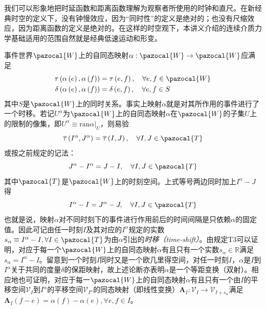 \documentclass[main.tex]{subfiles}
\begin{document}
我们可以形象地把时延函数和距离函数理解为观察者所使用的时钟和直尺。在新经典时空的定义下，没有钟慢效应，因为“同时性”的定义是绝对的；也没有尺缩效应，因为距离函数的定义是绝对的。在这样的时空观下，本讲义介绍的连续介质力学基础适用的范围自然就是经典低速运动和形变。

事件世界$\pazocal{W}$上的自同态映射$\alpha:\pazocal{W}\rightarrow\pazocal{W}$应满足
\begin{align*}
    \tau\left(\alpha\left(e\right),\alpha\left(f\right)\right)   & =\tau\left(e,f\right),\quad\forall e,f\in\pazocal{W} \\
    \delta\left(\alpha\left(e\right),\alpha\left(f\right)\right) & =\delta\left(e,f\right),\quad\forall e,f\in S
\end{align*}
其中$S$是$\pazocal{W}$上的同时关系。事实上映射$\alpha$就是对其所作用的事件进行了一个时移。若记$U^\alpha$为$\pazocal{W}$上的自同态映射$\alpha$在$\pazocal{W}$的子集$U$上的限制的像集，即$U^\alpha\equiv\mathrm{ran}\left.\alpha\right|_U$，则易验
\[\overline{\tau}\left(I^\alpha,J^\alpha\right)=\overline\tau\left(I,J\right),\quad\forall I,J\in\pazocal{T}\]
或按之前规定的记法：
\[J^\alpha-I^\alpha=J-I,\quad\forall I,J\in\pazocal{T}\]其中$\pazocal{T}$是$\pazocal{W}$上的时刻空间。上式等号两边同时加上$I^\alpha-J$得
\[I^\alpha-I=J^\alpha-J,\quad\forall I,J\in\pazocal{T}\]
也就是说，映射$\alpha$对不同时刻下的事件进行作用前后的时间间隔是只依赖$\alpha$的固定值。因此可记由任一时刻$I$及其对应的$I^\alpha$规定的实数$s_\alpha\equiv I^\alpha-I,\forall I\in\pazocal{T}$为由$\alpha$引出的\emph{时移（time-shift）}。由规定T3可以证明，对应于每一个$\pazocal{W}$上的自同态映射$\alpha$有且只有一个实数$s_\alpha\in\mathbb{R}$满足$s_\alpha=I^\alpha-I$。留意到一个时刻$I$同时又是一个欧几里得空间，对任一时刻$I$，$\alpha$是$I$到$I^\alpha$关于共同的度量$\delta$的保距映射，故上述论断亦表明$\alpha$是一个等距变换（双射）。相应地也可证明，对应于每一$\pazocal{W}$上的自同态映射$\alpha$有且只有一个由$I$的平移空间$\mathcal{V}_I$到$I^\alpha$的平移空间$\mathcal{V}_{I^\alpha}$的同态映射（即线性变换）$\mathbf{A}_I:\mathcal{V}_{I}\rightarrow\mathcal{V}_{I+s_\alpha}$满足$\mathbf{A}_I\left(f-e\right)=\alpha\left(f\right)-\alpha\left(e\right),\forall e,f\in I$。
\end{document}
